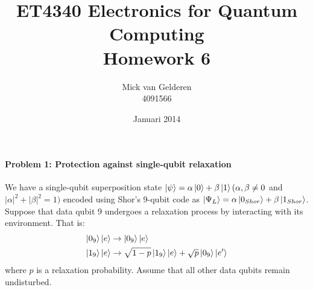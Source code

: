 \documentclass[12pt]{article}
\title{ET4340 Electronics for Quantum Computing\\Homework 6}
\author{
    Mick van Gelderen\\4091566
}
\date{Januari 2014}
\begin{document}
\maketitle

\paragraph{Problem 1: Protection against single-qubit relaxation} \hfill

We have a single-qubit superposition state $\ket{\psi} = \alpha\ket{0} + \beta\ket{1} (\alpha, \beta \neq 0$ and $ |\alpha|^2 + |\beta|^2 = 1)$ encoded using Shor's 9-qubit code as $\ket{\Psi_L} = \alpha\ket{0_{Shor}} + \beta\ket{1_{Shor}}$. Suppose that data qubit 9 undergoes a relaxation process by interacting with its environment. That is:
\begin{align*}
    \ket{0_9}\ket{e} &\rightarrow \ket{0_9}\ket{e} \\
    \ket{1_9}\ket{e} &\rightarrow \sqrt{1 - p}\ket{1_9}\ket{e} + \sqrt{p}\ket{0_9}\ket{e'}
\end{align*}
where $p$ is a relaxation probability. Assume that all other data qubits remain undisturbed.
\end{document}
